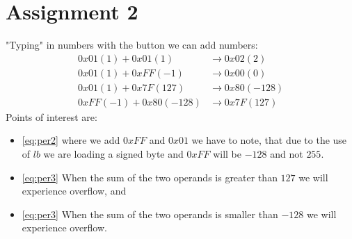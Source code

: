 \section{Assignment 2}
"Typing" in numbers with the button we can add numbers:
\begin{align}
0x01 (1) + 0x01 (1) &\rightarrow 0x02 (2)\label{eq:per1}\\
0x01 (1) + 0xFF (-1) &\rightarrow 0x00 (0)\label{eq:per2}\\
0x01 (1) + 0x7F (127) &\rightarrow 0x80 (-128)\label{eq:per3}\\
0xFF (-1) + 0x80 (-128) &\rightarrow 0x7F (127)\label{eq:per4}
\end{align}
Points of interest are:
\begin{itemize}
\item
\eqref{eq:per2} where we add $0xFF$ and $0x01$ we have to note, that due to the use of $lb$ we are loading a signed byte and $0xFF$ will be $-128$ and not $255$.
\item
\eqref{eq:per3} When the sum of the two operands is greater than $127$ we will experience overflow, and
\item
\eqref{eq:per3} When the sum of the two operands is smaller than $-128$ we will experience overflow.
\end{itemize}